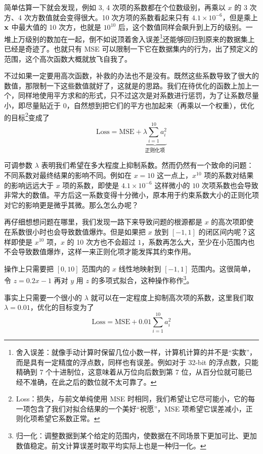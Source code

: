 简单估算一下就会发现，例如 3, 4 次项的系数都在个位数级别，再乘以 $x$ 的 3 次方、4 次方数值就会变得很大。10 次方项的系数看起来只有 $4.1\times 10^{-6}$，但是乘上 ${\mathbf{x}}$ 中最大值的 10 次方，也就是 $10^{10}$ 后，这个数值同样会飙升到上万的级别。一堆上万级别的数加在一起，倒不如说顶着舍入误差\footnote{舍入误差：就像手动计算时保留几位小数一样，计算机计算的并不是“实数”，而是具有一定精度的浮点数，同样也有误差。例如对于 32-bit 的浮点数，只能精确到 7 个十进制位，这意味着从万位向后数到第 7 位，从百分位就可能已经不准确，在此之后的数位就不太可靠了。}还能够回归到原来的数据集上已经是奇迹了。也就只有 MSE 可以限制一下它在数据集内的行为，出了预定义的范围，这个高次函数大概就放飞自我了。

不过如果一定要用高次函数，补救的办法也不是没有。既然这些系数导致了很大的数值，那限制一下这些数值就好了，这就是的思路。我们在待优化的函数上加上一个，同样地使用平方求和的形式，只不过这次是对系数进行惩罚，为了让系数尽量小，即尽量贴近于 $0$，自然想到把它们的平方也加起来（再乘以一个权重），优化的目标\footnote{Loss：损失，与前文单纯使用 MSE 时相同，我们希望让它尽可能小，它的每一项包含了我们对拟合结果的一个美好“祝愿”，MSE 项希望它误差减小，正则化项希望它系数正常。}变成了
\[
    \text{Loss} = \text{MSE} + \underset{\text{正则化项}}{\underbrace{\lambda \sum_{i=1}^{10} a_i^2}}
\]

可调参数 $\lambda$ 表明我们希望在多大程度上抑制系数。然而仍然有一个致命的问题：不同系数对最终结果的影响不同。例如在 $x=10$ 这一点上，$x^{10}$ 项的系数对结果的影响远远大于 $x$ 项的系数，即使是 $4.1\times 10^{-6}$ 这样微小的 $10$ 次项系数也会导致非常大的数值。平方后这一系数变得十分微小，原本用于约束系数大小的正则化项对它的影响更是微乎其微。那么怎么办呢？

再仔细想想问题在哪里，我们发现一路下来导致问题的根源都是 $x$ 的高次项即使在系数很小时也会导致数值爆炸。但是如果把 $x$ 放到 $[-1, 1]$ 的闭区间内呢？这样即使是 $x^{10}$ 项，$x$ 的 10 次方也不会超过 $1$，系数再怎么大，至少在小范围内也不会导致数值爆炸，这样一来正则化项才能发挥其约束作用。

操作上只需要把 $[0, 10]$ 范围内的 $x$ 线性地映射到 $[-1, 1]$ 范围内。这很简单，令 $z = 0.2 x - 1$ 再对 $y$ 用 $z$ 的多项式拟合，这种操作称作\footnote{归一化：调整数据到某个给定的范围内，使数据在不同场景下更加可比、更加数值稳定。前文计算误差时取平均实际上也是一种归一化。}。

事实上只需要一个很小的 $\lambda$ 就可以在一定程度上抑制高次项的系数，这里我们取 $\lambda = 0.01$，优化的目标变为了
\[
    \text{Loss} = \text{MSE} + 0.01 \sum_{i=1}^{10} a_i^2
\]


